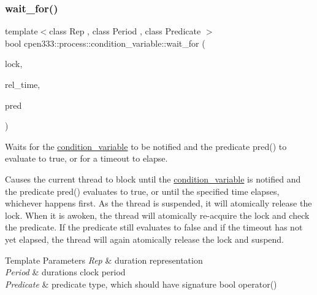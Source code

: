 \subsubsection{\texorpdfstring{wait\+\_\+for()}{wait\_for()}\hspace{0.1cm}{\footnotesize\ttfamily [2/2]}}
{\footnotesize\ttfamily template$<$class Rep , class Period , class Predicate $>$ \\
bool cpen333\+::process\+::condition\+\_\+variable\+::wait\+\_\+for (\begin{DoxyParamCaption}\item[{std\+::unique\+\_\+lock$<$ \hyperlink{classcpen333_1_1process_1_1mutex}{cpen333\+::process\+::mutex} $>$ \&}]{lock,  }\item[{const std\+::chrono\+::duration$<$ Rep, Period $>$ \&}]{rel\+\_\+time,  }\item[{Predicate}]{pred }\end{DoxyParamCaption})\hspace{0.3cm}{\ttfamily [inline]}}



Waits for the \hyperlink{classcpen333_1_1process_1_1condition__variable}{condition\+\_\+variable} to be notified and the predicate {\ttfamily pred()} to evaluate to {\ttfamily true}, or for a timeout to elapse. 

Causes the current thread to block until the \hyperlink{classcpen333_1_1process_1_1condition__variable}{condition\+\_\+variable} is notified and the predicate {\ttfamily pred()} evaluates to {\ttfamily true}, or until the specified time elapses, whichever happens first. As the thread is suspended, it will atomically release the lock. When it is awoken, the thread will atomically re-\/acquire the lock and check the predicate. If the predicate still evaluates to {\ttfamily false} and if the timeout has not yet elapsed, the thread will again atomically release the lock and suspend.


\begin{DoxyTemplParams}{Template Parameters}
{\em Rep} & duration representation \\
\hline
{\em Period} & duration\textquotesingle{}s clock period \\
\hline
{\em Predicate} & predicate type, which should have signature {\ttfamily bool operator()} \\
\hline
\end{DoxyTemplParams}

